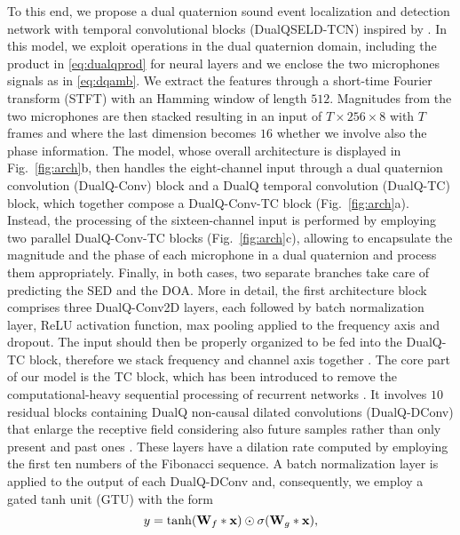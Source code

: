 \documentclass[3p, preprint, twocolumn]{elsarticle}
\begin{document}
To this end, we propose a dual quaternion sound event localization and detection network with temporal convolutional blocks (DualQSELD-TCN) inspired by \cite{Brignone2022ISCAS}. In this model, we exploit operations in the dual quaternion domain, including the product in \eqref{eq:dualqprod} for neural layers and we enclose the two microphones signals as in \eqref{eq:dqamb}.
We extract the features through a short-time Fourier transform (STFT) with an Hamming window of length $512$. Magnitudes from the two microphones are then stacked resulting in an input of $T \times 256 \times 8$ with $T$ frames and where the last dimension becomes $16$ whether we involve also the phase information. The model, whose overall architecture is displayed in Fig.~\ref{fig:arch}b, then handles the eight-channel input through a dual quaternion convolution (DualQ-Conv) block and a DualQ temporal convolution (DualQ-TC) block, which together compose a DualQ-Conv-TC block (Fig.~\ref{fig:arch}a). Instead, the processing of the sixteen-channel input is performed by employing two parallel DualQ-Conv-TC blocks (Fig.~\ref{fig:arch}c), allowing to encapsulate the magnitude and the phase of each microphone in a dual quaternion and process them appropriately. Finally, in both cases, two separate branches take care of predicting the SED and the DOA. More in detail, the first architecture block comprises three DualQ-Conv2D layers, each followed by batch normalization layer, ReLU activation function, max pooling applied to the frequency axis and dropout. The input should then be properly organized to be fed into the DualQ-TC block, therefore we stack frequency and channel axis together \cite{Brignone2022ISCAS}. The core part of our model is the TC block, which has been introduced to remove the computational-heavy sequential processing of recurrent networks \cite{SELD-TCN}. It involves $10$ residual blocks containing DualQ non-causal dilated convolutions (DualQ-DConv) that enlarge the receptive field considering also future samples rather than only present and past ones \cite{oord2016wavenet, wavenet}. These layers have a dilation rate computed by employing the first ten numbers of the Fibonacci sequence. A batch normalization layer is applied to the output of each DualQ-DConv and, consequently, we employ a gated tanh unit (GTU) with the form
\begin{equation}
    \centering
    y=\tanh(\mathbf{W}_f * \mathbf{x}) \odot \sigma (\mathbf{W}_g * \mathbf{x}),
\end{equation}
\end{document}
